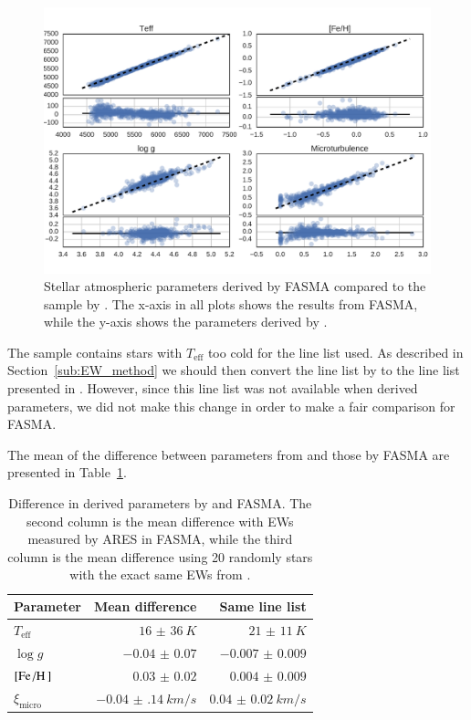 \documentclass{aa}
\begin{document}
\begin{figure}[tpb]
    \centering
    \includegraphics[width=1.0\linewidth,natwidth=750,natheight=500]{figures/FASMATest.pdf}
    \caption{Stellar atmospheric parameters derived by FASMA compared
    to the sample by \citet{Sousa2011}. The x-axis in all plots shows the results
    from FASMA, while the y-axis shows the parameters derived by \citet{Sousa2011}.}
    \label{fig:FASMATest}
\end{figure}

The sample contains stars with $T_\mathrm{eff}$ too cold for the line list used.
As described in Section~\ref{sub:EW_method} we should then convert the line list
by \citet{Sousa2008a} to the line list presented in \citet{Tsantaki2013}.
However, since this line list was not available when \citet{Sousa2011} derived
parameters, we did not make this change in order to make a fair comparison for
FASMA.

The mean of the difference between parameters from \citet{Sousa2011} and those
by FASMA are presented in Table~\ref{tab:FASMATest}.

\begin{table}[htb!]
    \caption{Difference in derived parameters by \citet{Sousa2011}
    and FASMA. The second column is the mean difference with EWs measured by
    ARES in FASMA, while the third column is the mean difference using
    20 randomly stars with the exact same EWs from \citet{Sousa2011}.}
    \label{tab:FASMATest}
    \centering
    \begin{tabular}{lrr}
      \hline\hline
      Parameter             &  Mean difference         & Same line list        \\
      \hline
      $T_\mathrm{eff}$      &  $\SI{16(36)}{K}$        & $\SI{21(11)}{K}$      \\
      $\log g$              &  $\num{-0.04(7)}$        & $\num{-0.007(9)}$     \\
      $[\ion{Fe}/\ion{H}]$  &  $\num{0.03(2)}$         & $\num{0.004(9)}$      \\
      $\xi_\mathrm{micro}$  &  $\SI{-0.04(14)}{km/s}$  & $\SI{0.04(2)}{km/s}$  \\
      \hline
    \end{tabular}
\end{table}
\end{document}

